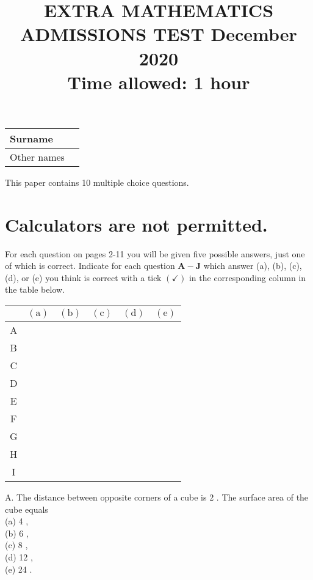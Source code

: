\documentclass[10pt]{article}
\title{EXTRA MATHEMATICS ADMISSIONS TEST December 2020 \\
 Time allowed: 1 hour }
\author{}
\date{}
\begin{document}
\maketitle
\begin{center}
\begin{tabular}{|l|l|}
\hline
Surname &  \\
\hline
Other names &  \\
\hline
\end{tabular}
\end{center}

This paper contains 10 multiple choice questions.

\section*{Calculators are not permitted.}
For each question on pages 2-11 you will be given five possible answers, just one of which is correct. Indicate for each question $\mathbf{A}-\mathbf{J}$ which answer (a), (b), (c), (d), or (e) you think is correct with a tick $(\checkmark)$ in the corresponding column in the table below.

\begin{center}
\begin{tabular}{|c|l|l|l|l|l|}
\hline
 & $(\mathrm{a})$ & $(\mathrm{b})$ & $(\mathrm{c})$ & $(\mathrm{d})$ & $(\mathrm{e})$ \\
\hline
A &  &  &  &  &  \\
\hline
B &  &  &  &  &  \\
\hline
C &  &  &  &  &  \\
\hline
D &  &  &  &  &  \\
\hline
E &  &  &  &  &  \\
\hline
F &  &  &  &  &  \\
\hline
G &  &  &  &  &  \\
\hline
H &  &  &  &  &  \\
\hline
I &  &  &  &  &  \\
\hline
\end{tabular}
\end{center}

A. The distance between opposite corners of a cube is 2 . The surface area of the cube equals\\
(a) 4 ,\\
(b) 6 ,\\
(c) 8 ,\\
(d) 12 ,\\
(e) 24 .
\end{document}
